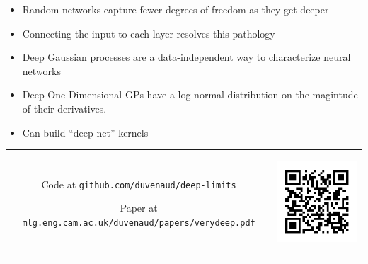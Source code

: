\documentclass[portrait,a0b,final,a4resizeable]{include/a0poster}
\begin{document}
\begin{poster}
\begin{multicols}{2}
\begin{minipage}[c]{0.39\columnwidth}
\begin{centering}
\begin{tabular}{c}
\end{tabular}
\end{centering}
\end{minipage}








\begin{itemize}
	\item Random networks capture fewer degrees of freedom as they get deeper
	\item Connecting the input to each layer resolves this pathology
	\item Deep Gaussian processes are a data-independent way to characterize neural networks
	\item Deep One-Dimensional GPs have a log-normal distribution on the magintude of their derivatives.
	\item Can build ``deep net'' kernels
\end{itemize}


\raggedright

\begin{tabular}{cc}
\begin{minipage}[c]{0.8\columnwidth}

Code at \texttt{github.com/duvenaud/deep-limits}

Paper at \texttt{mlg.eng.cam.ac.uk/duvenaud/papers/verydeep.pdf}

\end{minipage}
&
\begin{minipage}[c]{0.2\columnwidth}
\begin{centering}
\includegraphics[width=\linewidth]{figures/qrcode-paper-link}
\end{centering}
\end{minipage}
\end{tabular}
%
%
%
\end{multicols}
\end{poster}
\end{document}
